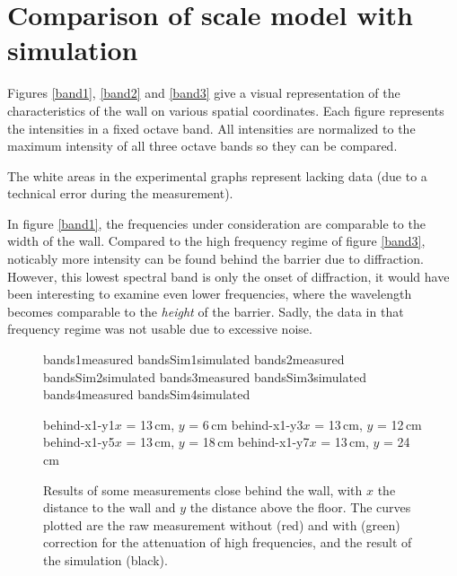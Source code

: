\section{Comparison of scale model with simulation \label{sectComparison}}
Figures \ref{band1}, \ref{band2} and \ref{band3} give a visual representation of the characteristics of the wall on various spatial coordinates. Each figure represents the intensities in a fixed octave band. All intensities are normalized to the maximum intensity of all three octave bands so they can be compared.

The white areas in the experimental graphs represent lacking data (due to a technical error during the measurement).

In figure \ref{band1}, the frequencies under consideration are comparable to the width of the wall. Compared to the high frequency regime of figure \ref{band3}, noticably more intensity can be found behind the barrier due to diffraction. However, this lowest spectral band is only the onset of diffraction, it would have been interesting to examine even lower frequencies, where the wavelength becomes comparable to the \emph{height} of the barrier. Sadly, the data in that frequency regime was not usable due to excessive noise.






\begin{figure}
	{bands1}{measured}
	{bandsSim1}{simulated}
	{bands2}{measured}
	{bandsSim2}{simulated}
	{bands3}{measured}
	{bandsSim3}{simulated}
	{bands4}{measured}
	{bandsSim4}{simulated}
\end{figure}




\begin{figure}
\figOctaveTwoNoFigNoCaption{-0.0cm}
	{behind-x1-y1}{$x$ = 13\,cm, $y$ = 6\,cm}
	{behind-x1-y3}{$x$ = 13\,cm, $y$ = 12\,cm}
\figOctaveTwoNoFigNoCaption{-0.0cm}
	{behind-x1-y5}{$x$ = 13\,cm, $y$ = 18\,cm}
	{behind-x1-y7}{$x$ = 13\,cm, $y$ = 24\,cm}
\caption{Results of some measurements close behind the wall, with $x$ the distance to the wall and $y$ the distance above the floor. The curves plotted are the raw measurement without (red) and with (green) correction for the attenuation of high frequencies, and the result of the simulation (black). \label{behindNear}}
\end{figure}

